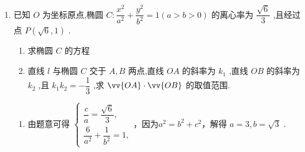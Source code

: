\begin{enumerate}
\begin{dingautolist}{172}
        \end{dingautolist}
        \begin{jieda}
            不妨设$M$在第一象限，则$M\left(\dfrac{4}{3}, \dfrac{\sqrt{15}}{3}\right)$
        \end{jieda}
    \item 已知 $O$ 为坐标原点,椭圆 $C : \dfrac{{x}^{2}}{{a}^{2}} + \dfrac{{y}^{2}}{{b}^{2}} = 1\left( {a > b > 0}\right)$ 的离心率为 $\dfrac{\sqrt{6}}{3}$ ,且经过点 $P\left( {\sqrt{6},1}\right)$ .
    \begin{enumerate}
        \item 求椭圆 $C$ 的方程
        \item 直线 $l$ 与椭圆 $C$ 交于 $A,B$ 两点,直线 ${OA}$ 的斜率为 ${k}_{1}$ ,直线 ${OB}$ 的斜率为 ${k}_{2}$ ,且 ${k}_{1}{k}_{2} =  - \dfrac{1}{3}$ ,求 $\vv{OA} \cdot  \vv{OB}$ 的取值范围.
    \end{enumerate}
    \begin{jieda}
        \begin{enumerate}
            \item 由题意可得 $\left\{  \begin{array}{l} \dfrac{c}{a} = \dfrac{\sqrt{6}}{3}, \\  \dfrac{6}{{a}^{2}} + \dfrac{1}{{b}^{2}} = 1, \end{array}\right.$，因为${a}^{2} = {b}^{2} + {c}^{2}$，解得 $a = 3,b = \sqrt{3}$ .
            

\end{enumerate}
\end{jieda}
\end{enumerate}
